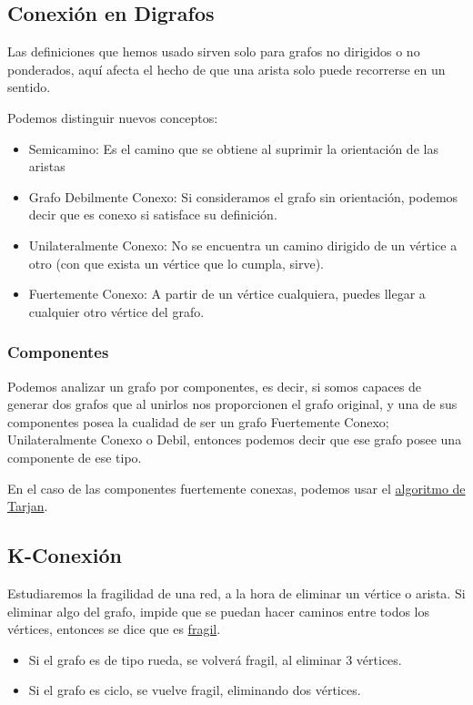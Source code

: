 \subsection{Conexión en Digrafos}
Las definiciones que hemos usado sirven solo para grafos no dirigidos o no ponderados, aquí afecta el hecho de que una arista solo puede recorrerse en un sentido.
\par Podemos distinguir nuevos conceptos:
\begin{itemize}
        \item Semicamino: Es el camino que se obtiene al suprimir la orientación de las aristas
        \item Grafo Debilmente Conexo: Si consideramos el grafo sin orientación, podemos decir que es conexo si satisface su definición.
        \item Unilateralmente Conexo: No se encuentra un camino dirigido de un vértice a otro (con que exista un vértice que lo cumpla, sirve).
        \item Fuertemente Conexo: A partir de un vértice cualquiera, puedes llegar a cualquier otro vértice del grafo.
\end{itemize}
\subsubsection{Componentes}
Podemos analizar un grafo por componentes, es decir, si somos capaces de generar dos grafos que al unirlos nos proporcionen el grafo original, y una de sus componentes posea la cualidad de ser un grafo Fuertemente Conexo; Unilateralmente Conexo o Debil, entonces podemos decir que ese grafo posee una componente de ese tipo.
\par En el caso de las componentes fuertemente conexas, podemos usar el \underline{algoritmo de Tarjan}.
\subsection{K-Conexión}
Estudiaremos la fragilidad de una red, a la hora de eliminar un vértice o arista. Si eliminar algo del grafo, impide que se puedan hacer caminos entre todos los vértices, entonces se dice que es \underline{fragil}.
\begin{itemize}
        \item Si el grafo es de tipo rueda, se volverá fragil, al eliminar 3 vértices.
        \item Si el grafo es ciclo, se vuelve fragil, eliminando dos vértices.

\end{itemize}

